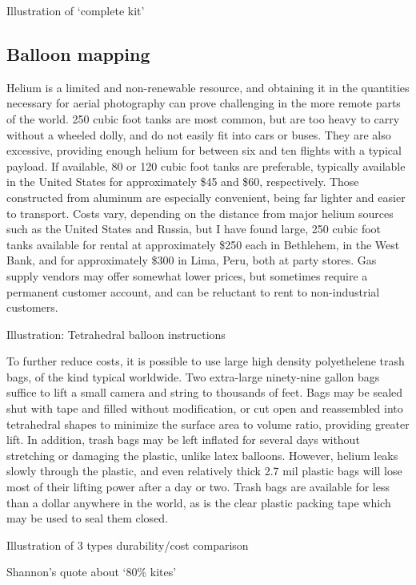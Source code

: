\documentclass[11pt]{report}
\begin{document}
Illustration of `complete kit'

\subsection{Balloon mapping}

Helium is a limited and non-renewable resource, and obtaining it in the quantities necessary for aerial photography can prove challenging in the more remote parts of the world. 250 cubic foot tanks are most common, but are too heavy to carry without a wheeled dolly, and do not easily fit into cars or buses. They are also excessive, providing enough helium for between six and ten flights with a typical payload. If available, 80 or 120 cubic foot tanks are preferable, typically available in the United States for approximately \$45 and \$60, respectively. Those constructed from aluminum are especially convenient, being far lighter and easier to transport. Costs vary, depending on the distance from major helium sources such as the United States and Russia, but I have found large, 250 cubic foot tanks available for rental at approximately \$250 each in Bethlehem, in the West Bank, and for approximately \$300 in Lima, Peru, both at party stores. Gas supply vendors may offer somewhat lower prices, but sometimes require a permanent customer account, and can be reluctant to rent to non-industrial customers. 

Illustration: Tetrahedral balloon instructions

To further reduce costs, it is possible to use large high density polyethelene trash bags, of the kind typical worldwide. Two extra-large ninety-nine gallon bags suffice to lift a small camera and string to thousands of feet. Bags may be sealed shut with tape and filled without modification, or cut open and reassembled into tetrahedral shapes to minimize the surface area to volume ratio, providing greater lift. In addition, trash bags may be left inflated for several days without stretching or damaging the plastic, unlike latex balloons. However, helium leaks slowly through the plastic, and even relatively thick 2.7 mil plastic bags will lose most of their lifting power after a day or two. Trash bags are available for less than a dollar anywhere in the world, as is the clear plastic packing tape which may be used to seal them closed.  

Illustration of 3 types durability/cost comparison

Shannon's quote about `80\% kites'
\end{document}
